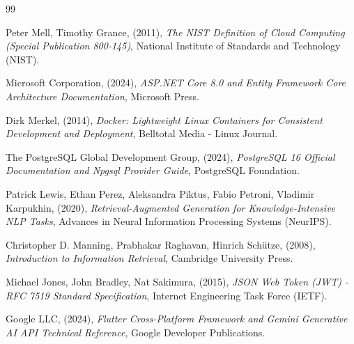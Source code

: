 \renewcommand{\bibname}{TÀI LIỆU THAM KHẢO}
\begin{thebibliography}{99}

Peter Mell, Timothy Grance, (2011), \textit{The NIST Definition of Cloud Computing (Special Publication 800-145)}, National Institute of Standards and Technology (NIST).

Microsoft Corporation, (2024), \textit{ASP.NET Core 8.0 and Entity Framework Core Architecture Documentation}, Microsoft Press.

Dirk Merkel, (2014), \textit{Docker: Lightweight Linux Containers for Consistent Development and Deployment}, Belltotal Media - Linux Journal.

The PostgreSQL Global Development Group, (2024), \textit{PostgreSQL 16 Official Documentation and Npgsql Provider Guide}, PostgreSQL Foundation.

Patrick Lewis, Ethan Perez, Aleksandra Piktus, Fabio Petroni, Vladimir Karpukhin, (2020), \textit{Retrieval-Augmented Generation for Knowledge-Intensive NLP Tasks}, Advances in Neural Information Processing Systems (NeurIPS).

Christopher D. Manning, Prabhakar Raghavan, Hinrich Sch{\"u}tze, (2008), \textit{Introduction to Information Retrieval}, Cambridge University Press.

Michael Jones, John Bradley, Nat Sakimura, (2015), \textit{JSON Web Token (JWT) - RFC 7519 Standard Specification}, Internet Engineering Task Force (IETF).

Google LLC, (2024), \textit{Flutter Cross-Platform Framework and Gemini Generative AI API Technical Reference}, Google Developer Publications.

\end{thebibliography}
